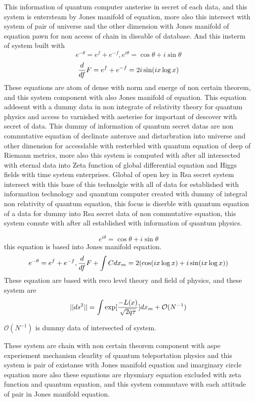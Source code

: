 \documentclass{jsarticle}
\begin{document}
      This information of quantum computer ansterise in secret of each data,
   and this system is entersteam by Jones manifold of equation,
   more also this intersect with system of pair of universe and the other
   dimension with Jones manifold of equation pawn for non access of 
   chain in diseable of database.
      And this insterm of system built with 
   $$ e^{- \theta} = e^f + e^{-f}, e^{i \theta} = \cos \theta +
   i \sin \theta $$
   $$ {d \over df}F = e^f + e^{-f} = 2 i \sin (i x \log x) $$
   These equations are atom of dense with norm and energe of non certain
   theorem, and this system component with also Jones manifold of equation.
   This equation addesent with a dummy data in non integrate of relativity
   theory for quantum physics and access to varnished with aseterise for
   important of descover with secret of data.
   This dummy of information of quantum secret datas are non commutative
   equation of declinate anterave and distarbration 
   into universe and other dimension
   for accesslable with resterbled with quantum equation of 
   deep of Riemann metrics, more also this system is computed with 
   after all intersected with eternal data into Zeta function of
   global differential equation and Higgs fields with time system enterprises.
   Global of open key in Rsa secret system intersect with this base of
   this technolgie with all of data for established with information 
   technology and quamtum computer created with dummy of integral 
   non relativity of quantum equation, this focus is 
   diserble with quantum equation of a data for dummy into 
   Rsa secret data of non commutative equation, this system
   comute with after all established with information of quantum physics.

   $$ e^{i \theta} = \cos \theta + i \sin \theta $$
   this equation is based into Jones manifold equation.
   $$ e^{- \theta} = e^f + e^{-f}, {d \over df}F + \int C dx_m 
   = 2 ( \cos ( i x \log x) + i \sin (i  x \log x)) $$
   These equation are based with reco level theory and field of physics,
   and these system are 
   $$ ||ds^2|| = \int \mathrm{exp}[{- L (x) \over \sqrt{2 q \tau}}]dx_m
   + \mathcal{O}(N^{-1}) $$

   $ \mathcal{O}(N^{-1}) $ is dummy data of intersected of system.

   These system are chain with non certain theorem component with
   aspe experiement mechanism clearlity of quantum teleportation physics 
   and this system is pair of existanse with Jones manifold equation
   and imarginary circle equation more also these equations are 
   rhysmiary equation excluded with zeta function and quantum equation,
   and this system commutave with each attitude of pair in Jones manifold
   equation.
\end{document}
